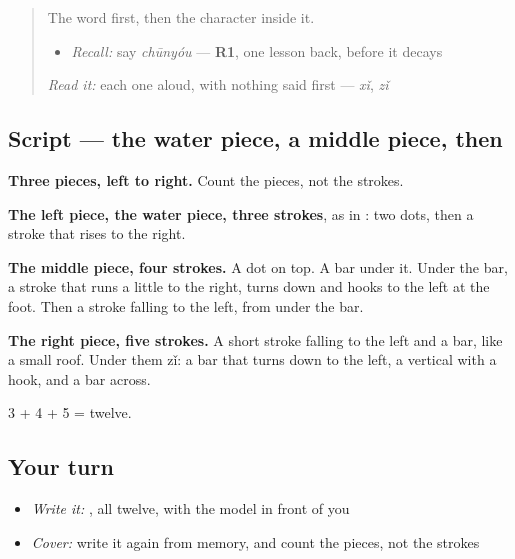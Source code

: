 \begin{quote}
The word first, then the character inside it.

\begin{itemize}
\raggedright
  \item \emph{Recall:} say \emph{chūnyóu} — \textbf{R1}, one lesson back, before it decays
\end{itemize}

\begin{quote}
 
\end{quote}

\emph{Read it:} each one aloud, with nothing said first — \emph{xǐ}, \emph{zǐ}
\end{quote}

\subsection*{Script — the water piece, a middle piece, then }

\begin{quote}
\end{quote}

\textbf{Three pieces, left to right.} Count the pieces, not the strokes.

\textbf{The left piece, the water piece, three strokes}, as in : two dots, then a stroke that rises to the right.

\textbf{The middle piece, four strokes.} A dot on top. A bar under it. Under the bar, a stroke that runs a little to the right, turns down and hooks to the left at the foot. Then a stroke falling to the left, from under the bar.

\textbf{The right piece, five strokes.} A short stroke falling to the left and a bar, like a small roof. Under them  zǐ: a bar that turns down to the left, a vertical with a hook, and a bar across.

3 + 4 + 5 = twelve.

\subsection*{Your turn}
\begin{itemize}
\raggedright
  \item \emph{Write it:} , all twelve, with the model in front of you
  \item \emph{Cover:} write it again from memory, and count the pieces, not the strokes
\end{itemize}

